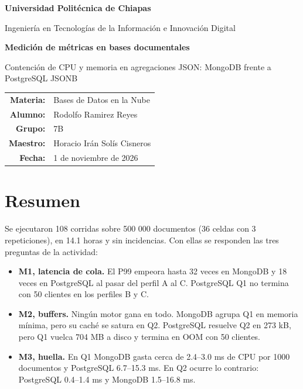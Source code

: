 \documentclass[11pt,letterpaper]{article}
\begin{document}
\begin{titlepage}
\centering
{\Large\bfseries Universidad Politécnica de Chiapas\par}
\vspace{0.4cm}
{\large Ingeniería en Tecnologías de la Información e Innovación Digital\par}
\vspace{2.5cm}
{\LARGE\bfseries Medición de métricas en bases documentales\par}
\vspace{0.8cm}
{\large Contención de CPU y memoria en agregaciones JSON: MongoDB frente a PostgreSQL JSONB\par}
\vfill
\begin{tabular}{rl}
\textbf{Materia:} & Bases de Datos en la Nube \\[0.3em]
\textbf{Alumno:} & Rodolfo Ramirez Reyes \\[0.3em]
\textbf{Grupo:} & 7B \\[0.3em]
\textbf{Maestro:} & Horacio Irán Solís Cisneros \\[0.3em]
\textbf{Fecha:} & 1 de noviembre de 2026 \\
\end{tabular}
\vspace{2cm}
\end{titlepage}

\tableofcontents
\newpage

\section*{Resumen}

Se ejecutaron 108 corridas sobre 500 000 documentos (36 celdas con 3 repeticiones), en 14.1 horas y sin incidencias. Con ellas se responden las tres preguntas de la actividad:

\begin{itemize}
\item \textbf{M1, latencia de cola.} El P99 empeora hasta 32 veces en MongoDB y 18 veces en PostgreSQL al pasar del perfil A al C. PostgreSQL Q1 no termina con 50 clientes en los perfiles B y C.
\item \textbf{M2, buffers.} Ningún motor gana en todo. MongoDB agrupa Q1 en memoria mínima, pero su caché se satura en Q2. PostgreSQL resuelve Q2 en 273 kB, pero Q1 vuelca 704 MB a disco y termina en OOM con 50 clientes.
\item \textbf{M3, huella.} En Q1 MongoDB gasta cerca de 2.4–3.0 ms de CPU por 1000 documentos y PostgreSQL 6.7–15.3 ms. En Q2 ocurre lo contrario: PostgreSQL 0.4–1.4 ms y MongoDB 1.5–16.8 ms.
\end{itemize}
\end{document}
